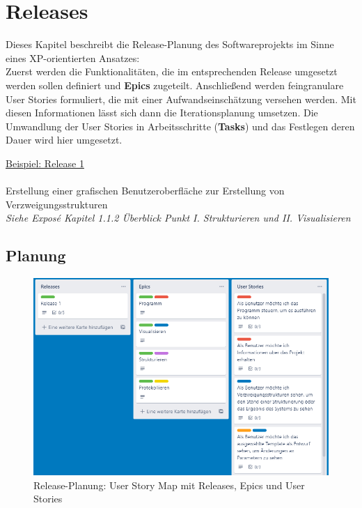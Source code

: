 \documentclass[11pt]{article}
\begin{document}
    \section{Releases}
    Dieses Kapitel beschreibt die Release-Planung des Softwareprojekts im Sinne eines XP-orientierten Ansatzes:\\
    Zuerst werden die Funktionalitäten, die im entsprechenden Release umgesetzt werden sollen definiert und \textbf{Epics}
    zugeteilt.
    Anschließend werden feingranulare User Stories formuliert, die mit einer Aufwandseinschätzung versehen werden.
    Mit diesen Informationen lässt sich dann die Iterationsplanung umsetzen.
    Die Umwandlung der User Stories in Arbeitsschritte (\textbf{Tasks}) und das Festlegen deren Dauer wird hier umgesetzt.

    \newpage

    \underline{Beispiel: Release 1}\\~\\
    Erstellung einer grafischen Benutzeroberfläche zur Erstellung von Verzweigungsstrukturen\\
    \textit{Siehe Exposé Kapitel 1.1.2 Überblick Punkt I. Strukturieren und II. Visualisieren}
    
    \subsection{Planung}
    \begin{figure}[H]
        \centering
        \includegraphics[width=12cm]{../images/User_Story_Map.PNG}
        \caption{Release-Planung: User Story Map mit Releases, Epics und User Stories}
    \end{figure}

    \newpage
\end{document}
